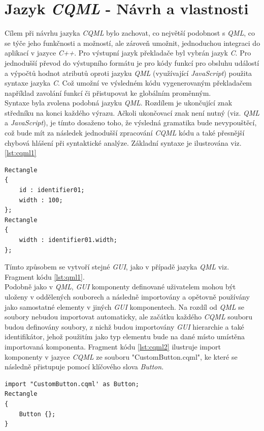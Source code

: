 \documentclass[11pt,twoside,a4paper]{book}
\begin{document}
\section{\label{SEC:CQML}Jazyk \textit{CQML} - Návrh a vlastnosti}
Cílem při návrhu jazyka \textit{CQML} bylo zachovat, co největší podobnost s \textit{QML}, co se týče jeho funkčnosti a možností, ale zároveň umožnit, jednoduchou integraci do aplikací v jazyce \textit{C++}. Pro výstupní jazyk překladače byl vybrán jazyk \textit{C}. Pro jednodušší převod do výstupního formátu je pro kódy funkcí pro obsluhu událostí a výpočtů hodnot atributů oproti jazyku \textit{QML} (využívající \textit{JavaScript}) použita syntaxe jazyka \textit{C}. Což umožní ve výsledném kódu vygenerovaným překladačem například zavolání funkcí či přistupovat ke globálním proměnným.\\
Syntaxe byla zvolena podobná jazyku \textit{QML}. Rozdílem je ukončující znak středníku na konci každého výrazu. Ačkoli ukončovací znak není nutný (viz. \textit{QML} a \textit{JavaScript}), je tímto dosaženo toho, že výsledná gramatika bude nevypouštěcí, což bude mít za následek jednodušší zpracování \textit{CQML} kódu a také přesnější chybová hlášení při syntaktické analýze. Základní syntaxe je ilustrována viz. \ref{lst:cqml1}
\begin{lstlisting}[frame=single,caption=Tvorba dvou jednoduchých elementů pomocí jazyka \textit{CQML}.,label=lst:cqml1]
Rectangle
{
	id : identifier01;
	width : 100;
};
Rectangle
{
	width : identifier01.width;
};
\end{lstlisting}
Tímto způsobem se vytvoří stejné \textit{GUI}, jako v případě jazyka \textit{QML} viz. Fragment kódu \ref{lst:qml1}.\\
Podobně jako v \textit{QML}, \textit{GUI} komponenty definované uživatelem mohou být uloženy v oddělených souborech a následně importovány a opětovně používány jako samostatné elementy v jiných \textit{GUI} komponentech. Na rozdíl od \textit{QML} se soubory nebudou importovat automaticky, ale začátku každého \textit{CQML} souboru budou definovány soubory, z nichž budou importovány \textit{GUI} hierarchie a také identifikátor, jehož použitím jako typ elementu bude na dané místo umístěna importovaná komponenta. Fragment kódu \ref{lst:cqml2} ilustruje import komponenty v jazyce \textit{CQML} ze souboru "CustomButton.cqml", ke které se následně přistupuje pomocí klíčového slova \textit{Button}.
\begin{lstlisting}[frame=single,caption=Ukázka importu komponenty v jazyce \textit{CQML}.,label=lst:cqml2]
import "CustomButton.cqml' as Button;
Rectangle
{
	Button {};
}
\end{lstlisting}
\end{document}
